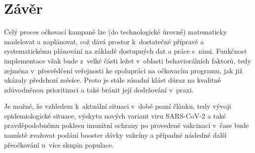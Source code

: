 \section*{Závěr}

Celý proces očkovací kampaně lze (do technologické úrovně) matematicky modelovat a naplánovat, což dává prostor k~dostatečné přípravě a systematickému plánování na základě dostupných dat a práce s~nimi. Funkčnost implementace však bude z~velké části ležet v~oblasti behaviorálních faktorů, tedy zejména v~přesvědčení veřejnosti ke spolupráci na očkovacím programu, jak již ukázaly předchozí měsíce. 
%
Proto je stále zásadní klást důraz na kvalitně zdůvodněnou prioritizaci a také bránit její dodržování v~praxi. %

Je možné, že vzhledem k~aktuální situaci v~době psaní článku, tedy vývoji epidemiologické situace, výskytu nových variant viru SARS-CoV-2 a také pravděpodobnému poklesu imunitní ochrany po provedené vakcinaci v~čase bude namístě zvažovat podání booster dávky vakcíny a případné následné další přeočkování u~více skupin populace. %

